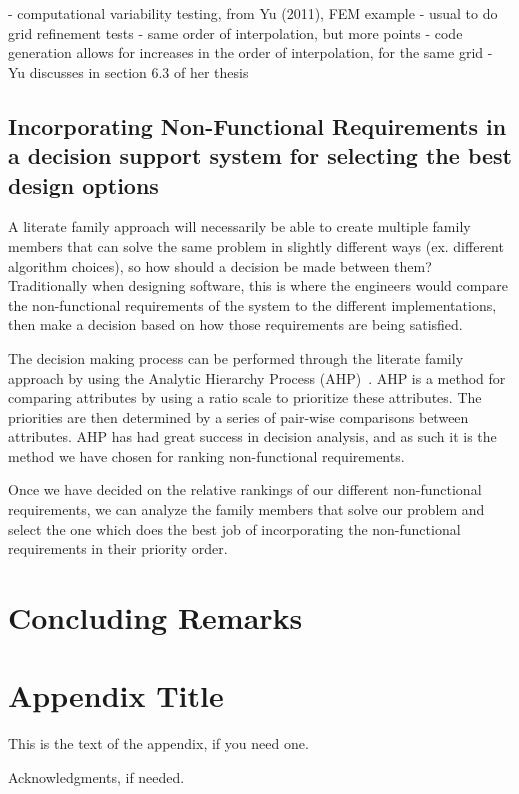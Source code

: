 \documentclass[10pt, preprint]{sigplanconf}
\begin{document}
- computational variability testing, from Yu (2011), FEM example - usual to do
grid refinement tests - same order of interpolation, but more points - code
generation allows for increases in the order of interpolation, for the same grid
- Yu discusses in section 6.3 of her thesis

\subsection{Incorporating Non-Functional Requirements in a decision support
  system for selecting the best design options} \label{subsec:incorporating}

A literate family approach will necessarily be able to create multiple family
members that can solve the same problem in slightly different ways (ex.
different algorithm choices), so how should a decision be made between them?
Traditionally when designing software, this is where the engineers would compare
the non-functional requirements of the system to the different implementations,
then make a decision based on how those requirements are being satisfied.

The decision making process can be performed through the literate family
approach by using the Analytic Hierarchy Process (AHP)~\cite{Smith2006}. AHP is
a method for comparing attributes by using a ratio scale to prioritize these
attributes. The priorities are then determined by a series of pair-wise 
comparisons between attributes. AHP has had great success in decision analysis,
and as such it is the method we have chosen for ranking non-functional 
requirements.

Once we have decided on the relative rankings of our different non-functional
requirements, we can analyze the family members that solve our problem and
select the one which does the best job of incorporating the non-functional 
requirements in their priority order.



\section{Concluding Remarks} \label{sec:concluding}

\appendix
\section{Appendix Title}

This is the text of the appendix, if you need one.

\acks

Acknowledgments, if needed.





\begin{thebibliography}{}
\softraggedright


\end{thebibliography}
\end{document}
